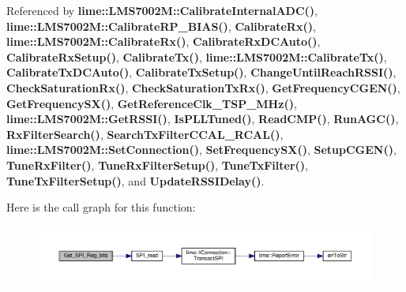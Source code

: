 Referenced by {\bf lime\+::\+L\+M\+S7002\+M\+::\+Calibrate\+Internal\+A\+D\+C()}, {\bf lime\+::\+L\+M\+S7002\+M\+::\+Calibrate\+R\+P\+\_\+\+B\+I\+A\+S()}, {\bf Calibrate\+Rx()}, {\bf lime\+::\+L\+M\+S7002\+M\+::\+Calibrate\+Rx()}, {\bf Calibrate\+Rx\+D\+C\+Auto()}, {\bf Calibrate\+Rx\+Setup()}, {\bf Calibrate\+Tx()}, {\bf lime\+::\+L\+M\+S7002\+M\+::\+Calibrate\+Tx()}, {\bf Calibrate\+Tx\+D\+C\+Auto()}, {\bf Calibrate\+Tx\+Setup()}, {\bf Change\+Until\+Reach\+R\+S\+S\+I()}, {\bf Check\+Saturation\+Rx()}, {\bf Check\+Saturation\+Tx\+Rx()}, {\bf Get\+Frequency\+C\+G\+E\+N()}, {\bf Get\+Frequency\+S\+X()}, {\bf Get\+Reference\+Clk\+\_\+\+T\+S\+P\+\_\+\+M\+Hz()}, {\bf lime\+::\+L\+M\+S7002\+M\+::\+Get\+R\+S\+S\+I()}, {\bf Is\+P\+L\+L\+Tuned()}, {\bf Read\+C\+M\+P()}, {\bf Run\+A\+G\+C()}, {\bf Rx\+Filter\+Search()}, {\bf Search\+Tx\+Filter\+C\+C\+A\+L\+\_\+\+R\+C\+A\+L()}, {\bf lime\+::\+L\+M\+S7002\+M\+::\+Set\+Connection()}, {\bf Set\+Frequency\+S\+X()}, {\bf Setup\+C\+G\+E\+N()}, {\bf Tune\+Rx\+Filter()}, {\bf Tune\+Rx\+Filter\+Setup()}, {\bf Tune\+Tx\+Filter()}, {\bf Tune\+Tx\+Filter\+Setup()}, and {\bf Update\+R\+S\+S\+I\+Delay()}.



Here is the call graph for this function\+:
\nopagebreak
\begin{figure}[H]
\begin{center}
\leavevmode
\includegraphics[width=350pt]{da/d87/spi_8h_a6ca6565d9a3c9b39a4ad5239f27665c7_cgraph}
\end{center}
\end{figure}




